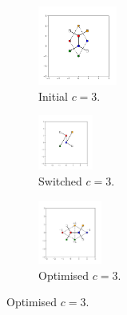 \begin{figure}[bt]
     \centering
     
     \begin{subfigure}[b]{0.25\textwidth}
         \centering
         \includegraphics[height=2.6cm]{./figures/general_networks/bs_move_a.pdf}
         \caption{Initial $c=3$.}
         \label{fig:bsmovea}
     \end{subfigure}
     \hfill
     \begin{subfigure}[b]{0.25\textwidth}
         \centering
         \includegraphics[height=1.8cm]{./figures/general_networks/bs_move_b.pdf}
         \caption{Switched $c=3$.}
         \label{fig:bsmoveb}
     \end{subfigure}
     \hfill
     \begin{subfigure}[b]{0.25\textwidth}
         \centering
         \includegraphics[height=2.1cm]{./figures/general_networks/bs_move_c.pdf}
         \caption{Optimised $c=3$.}
         \label{fig:bsmovec}
     \end{subfigure}
     

\end{figure}

